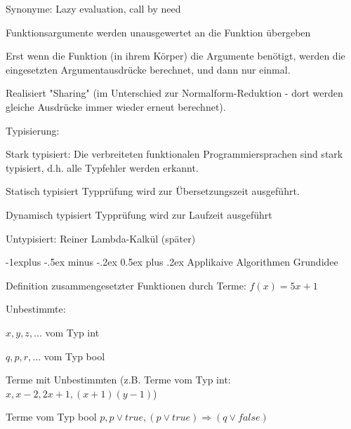 \documentclass[10pt]{article}
\makeatletter
\renewcommand{\subsection}{\@startsection{subsection}{2}{0mm}%
                                {-1explus -.5ex minus -.2ex}%
                                {0.5ex plus .2ex}%
                                {\normalfont\normalsize\bfseries}}
\makeatother
\begin{document}
\begin{itemize*}
\begin{itemize*}
\begin{itemize*}
      \item Synonyme: Lazy evaluation, call by need
      \item Funktionsargumente werden unausgewertet an die Funktion übergeben
      \item Erst wenn die Funktion (in ihrem Körper) die Argumente benötigt, werden die eingesetzten Argumentausdrücke berechnet, und dann nur einmal.
      \item Realisiert "Sharing" (im Unterschied zur Normalform-Reduktion - dort werden gleiche Ausdrücke immer wieder erneut berechnet).
    \end{itemize*}
  \end{itemize*}
  \item Typisierung:
  \begin{itemize*}
    \item Stark typisiert: Die verbreiteten funktionalen Programmiersprachen sind stark typisiert, d.h. alle Typfehler werden erkannt.
    \begin{description*}
      \item[Statisch typisiert] Typprüfung wird zur Übersetzungszeit ausgeführt.
      \item[Dynamisch typisiert] Typprüfung wird zur Laufzeit ausgeführt
    \end{description*}
    \item Untypisiert: Reiner Lambda-Kalkül (später)
  \end{itemize*}
\end{itemize*}

\subsection{Applikaive Algorithmen}
Grundidee
\begin{itemize*}
  \item Definition zusammengesetzter Funktionen durch Terme: $f(x) = 5x + 1$
  \item Unbestimmte:
  \begin{itemize*}
    \item $x, y, z, . . .$ vom Typ int
    \item $q, p, r , . . .$ vom Typ bool
  \end{itemize*}
  \item Terme mit Unbestimmten (z.B. Terme vom Typ int: $x, x - 2, 2x + 1, (x + 1)(y - 1)$)
  \item Terme vom Typ bool $p, p \vee true, (p \vee true) \Rightarrow (q \vee false)$
\end{itemize*}
\end{document}
